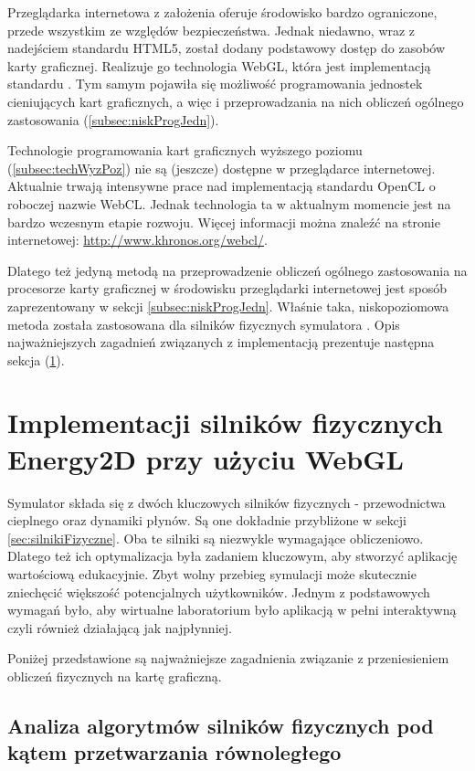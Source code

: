 Przeglądarka internetowa z założenia oferuje środowisko bardzo ograniczone,
przede wszystkim ze względów bezpieczeństwa. Jednak niedawno, wraz z nadejściem
standardu HTML5, został dodany podstawowy dostęp do zasobów karty graficznej.
Realizuje go technologia WebGL, która jest implementacją standardu . Tym samym pojawiła się możliwość programowania jednostek cieniujących kart
graficznych, a więc i przeprowadzania na nich obliczeń ogólnego zastosowania
(\ref{subsec:niskProgJedn}).

Technologie programowania kart graficznych wyższego poziomu
(\ref{subsec:techWyzPoz}) nie są (jeszcze) dostępne w przeglądarce internetowej.
Aktualnie trwają intensywne prace nad implementacją standardu OpenCL o roboczej
nazwie WebCL. Jednak technologia ta w aktualnym momencie jest na bardzo wczesnym
etapie rozwoju. Więcej informacji można znaleźć na stronie internetowej:
\url{http://www.khronos.org/webcl/}.

Dlatego też jedyną metodą na przeprowadzenie obliczeń ogólnego zastosowania na
procesorze karty graficznej w środowisku przeglądarki internetowej jest sposób
zaprezentowany w sekcji \ref{subsec:niskProgJedn}. Właśnie taka, niskopoziomowa
metoda została zastosowana dla silników fizycznych symulatora .
Opis najważniejszych zagadnień związanych z implementacją prezentuje następna
sekcja (\ref{sec:implSilFizWebGL}).

\section{Implementacji silników fizycznych Energy2D przy użyciu WebGL}
\label{sec:implSilFizWebGL}

Symulator  składa się z dwóch kluczowych silników fizycznych -
przewodnictwa cieplnego oraz dynamiki płynów. Są one dokładnie przybliżone w
sekcji \ref{sec:silnikiFizyczne}. Oba te silniki są niezwykle wymagające
obliczeniowo. Dlatego też ich optymalizacja była zadaniem kluczowym, aby
stworzyć aplikację wartościową edukacyjnie. Zbyt wolny przebieg symulacji może
skutecznie zniechęcić większość potencjalnych użytkowników. Jednym z
podstawowych wymagań było, aby wirtualne laboratorium było aplikacją w pełni
interaktywną czyli również działającą jak najpłynniej.

Poniżej przedstawione są najważniejsze zagadnienia związanie z przeniesieniem
obliczeń fizycznych  na kartę graficzną.

\subsection{Analiza algorytmów silników fizycznych pod kątem przetwarzania
równoległego}  

